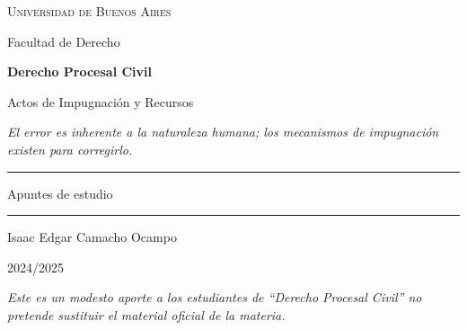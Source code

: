 \documentclass[12pt,oneside]{book}
\newcommand{\universidad}{Universidad de Buenos Aires}
\newcommand{\materia}{Derecho Procesal Civil}
\newcommand{\titulo}{Actos de Impugnación y Recursos}
\newcommand{\autor}{Isaac Edgar Camacho Ocampo}
\newcommand{\anio}{2024/2025}
\begin{document}

\begin{titlepage}

\thispagestyle{empty}

\begin{center}

\vspace*{1cm}

{\large \textsc{\universidad}}

\vspace{0.3cm}

{\large Facultad de Derecho}

\vspace{2.5cm}

{\Huge \textbf{\materia}}

\vspace{1.2cm}

{\LARGE \titulo}

\vspace{0.8cm}

\textit{El error es inherente a la naturaleza humana; los mecanismos de impugnación existen para corregirlo.}

\vspace{1.2cm}

\rule{0.70\textwidth}{0.5pt}

\vspace{0.5cm}

{\large Apuntes de estudio}

\vspace{0.5cm}

\rule{0.70\textwidth}{0.5pt}

\vfill

{\large \autor}

\vspace{0.3cm}

{\large \anio}

\end{center}

\vfill

\begin{flushleft}
\textit{Este es un modesto aporte a los estudiantes de ``Derecho Procesal Civil'' no pretende sustituir el material oficial de la materia.}
\end{flushleft}

\end{titlepage}
\end{document}
